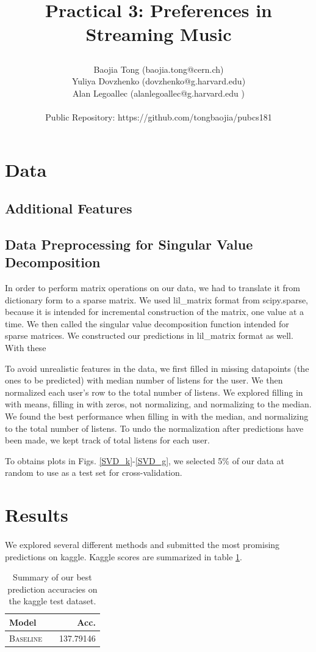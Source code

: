 \documentclass[11pt]{article}
\title{\begin{center}
{\Large Practical 3: Preferences in Streaming Music}
\end{center}}
\author{ Baojia Tong (baojia.tong@cern.ch)\\Yuliya Dovzhenko (dovzhenko@g.harvard.edu)\\Alan Legoallec (alanlegoallec@g.harvard.edu )\\\\Public Repository: https://github.com/tongbaojia/pubcs181}
\begin{document}
\maketitle{}
\section{Data}
\subsection{Additional Features}

\subsection{Data Preprocessing for Singular Value Decomposition}
In order to perform matrix operations on our data, we had to translate it from dictionary form to a sparse matrix. We used lil\_matrix format from scipy.sparse, because it is intended for incremental construction of the matrix, one value at a time. We then called the singular value decomposition function intended for sparse matrices. We constructed our predictions in lil\_matrix format as well. With these 

To avoid unrealistic features in the data, we first  filled in missing datapoints (the ones to be predicted) with median number of listens for the user. We then normalized each user's row to the total number of listens. We explored filling in with means, filling in with zeros, not normalizing, and normalizing to the median. We found the best performance when filling in with the median, and normalizing to the total number of listens. To undo the normalization after predictions have been made, we kept track of total listens for each user. 
 
To obtains plots in Figs. \ref{SVD_k}-\ref{SVD_g}, we selected 5\% of our data at random to use as a test set for cross-validation. 
\paragraph{} 
\section{Results}
\paragraph{} We explored several different methods and submitted the most promising predictions on kaggle. Kaggle scores are summarized in table \ref{tab:results}. 
  \begin{table}
\centering
\begin{tabular}{llr}
 \toprule
 Model &  & Acc. \\
 \midrule
 \textsc{Baseline} & &137.79146\\
 \bottomrule
\end{tabular}
\caption{\label{tab:results} Summary of our best prediction accuracies on the kaggle test dataset.}
\end{table}
\end{document}
